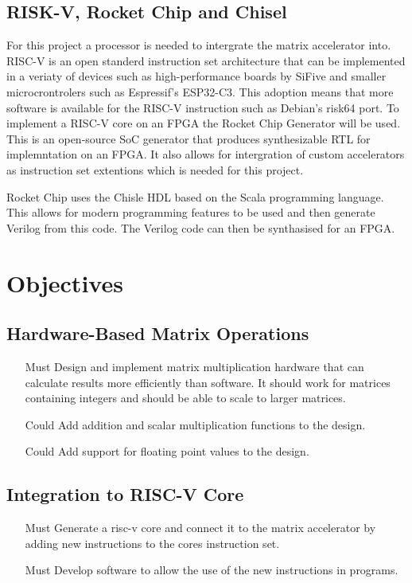 \documentclass[a4paper,fleqn,12pt]{article}
\begin{document}
	\subsection{RISK-V, Rocket Chip and Chisel}
	For this project a processor is needed to intergrate the matrix accelerator into. RISC-V is an open standerd instruction set architecture that can be implemented in a veriaty of devices such as high-performance boards by SiFive and smaller microcrontrolers such as Espressif's ESP32-C3. This adoption means that more software is available for the RISC-V instruction such as Debian's risk64 port. To implement a RISC-V core on an FPGA the Rocket Chip Generator will be used. This is an open-source SoC generator that produces synthesizable RTL for implemntation on an FPGA. It also allows for intergration of custom accelerators as instruction set extentions \citep{rocketchip} which is needed for this project.
	
	Rocket Chip uses the Chisle HDL based on the Scala programming language. This allows for modern programming features to be used and then generate Verilog from this code. The Verilog code can then be synthasised for an FPGA.
	
	\section{Objectives}
	\subsection{Hardware-Based Matrix Operations}
	\begin{enumerate}
		\item [Must]  Design and implement matrix multiplication hardware that can calculate results more efficiently than software. It should work for matrices containing integers and should be able to scale to larger matrices.
		\item [Could] Add addition and scalar multiplication functions to the design.
		\item [Could] Add support for floating point values to the design.
	\end{enumerate}
	\subsection{Integration to RISC-V Core}
	\begin{enumerate}
		\item [Must] Generate a risc-v core and connect it to the matrix accelerator by adding new instructions to the cores instruction set.
		\item [Must] Develop software to allow the use of the new instructions in programs.
	\end{enumerate}
\end{document}
